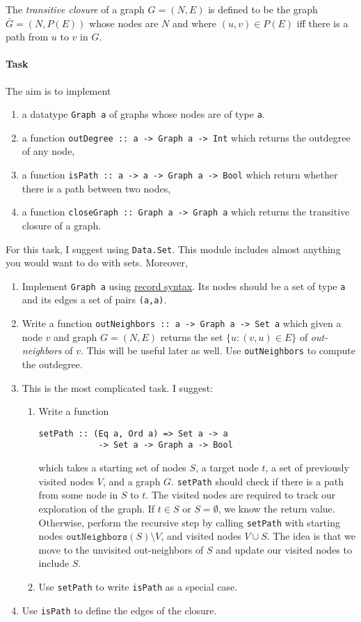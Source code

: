 \documentclass{article}[12pt]
\theoremstyle{definition}
\begin{document}
The \emph{transitive closure} of a graph $G = (N, E)$ is defined to be the graph $\bar G = (N, P(E))$ whose nodes are $N$ and where $(u,v) \in P(E)$ iff there is a path from $u$ to $v$ in $G$.

\paragraph{Task} The aim is to implement
\begin{enumerate}
    \item a datatype \verb|Graph a| of graphs whose nodes are of type \verb|a|.
    \item a function \verb|outDegree :: a -> Graph a -> Int| which returns the outdegree of any node,
    \item a function \verb|isPath :: a -> a -> Graph a -> Bool| which return whether there is a path between two nodes,
    \item a function \verb|closeGraph :: Graph a -> Graph a| which returns the transitive closure of a graph.
\end{enumerate}

For this task, I suggest using \verb|Data.Set|. This module includes almost anything you would want to do with sets. Moreover,
\begin{enumerate}
    \item Implement \verb|Graph a| using \href{https://devtut.github.io/haskell/record-syntax.html#basic-syntax}{record syntax}. Its nodes should be a set of type \verb|a| and its edges a set of pairs \verb|(a,a)|.
    \item Write a function \verb|outNeighbors :: a -> Graph a -> Set a| which given a node $v$ and graph $G = (N,E)$ returns the set $\{u : (v,u) \in E \}$ of \emph{out-neighbors} of $v$. This will be useful later as well. Use \verb|outNeighbors| to compute the outdegree.
    \item This is the most complicated task. I suggest:
    \begin{enumerate}
        \item Write a function 
\begin{verbatim}
setPath :: (Eq a, Ord a) => Set a -> a 
            -> Set a -> Graph a -> Bool
\end{verbatim}
        which takes a starting set of nodes $S$, a target node $t$, a set of previously visited nodes $V$, and a graph $G$. \verb|setPath| should check if there is a path from some node in $S$ to $t$. The visited nodes are required to track our exploration of the graph. If $t \in S$ or $S = \emptyset$, we know the return value. Otherwise, perform the recursive step by calling \verb|setPath| with starting nodes $\mathtt{outNeighbors}(S) \setminus V$, and visited nodes $V \cup S$. The idea is that we move to the unvisited out-neighbors of $S$ and update our visited nodes to include $S$.
        \item Use \verb|setPath| to write \verb|isPath| as a special case. 
    \end{enumerate}
    \item Use \verb|isPath| to define the edges of the closure.
\end{enumerate}
\end{document}

